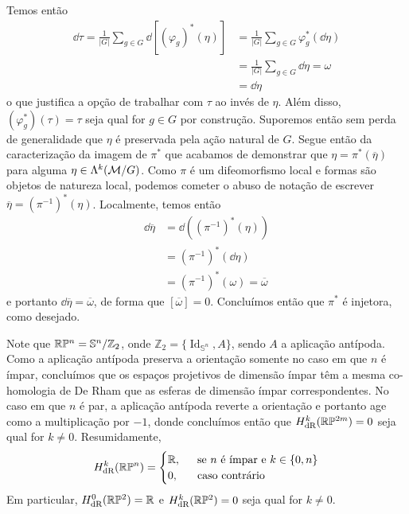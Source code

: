 \begin{dem}
\begin{demm}
Temos então
\begin{align*}
\dd \tau = \frac{1}{|G|} \sum_{g \in G} \dd \left[ (\varphi_g)^{\ast}(\eta)\right] &= \frac{1}{|G|} \sum_{g \in G} \varphi_g^{\ast}(\dd \eta) \\
&= \frac{1}{|G|} \sum_{g \in G} \dd \eta = \omega \\
&= \dd \eta
\end{align*}
o que justifica a opção de trabalhar com $\tau$ ao invés de $\eta$. Além disso, $(\varphi_g^{\ast})(\tau) = \tau$ seja qual for $g \in G$ por construção. Suporemos então sem perda de generalidade que $\eta$ é preservada pela ação natural de $G$. Segue então da caracterização da imagem de $\pi^{\ast}$ que acabamos de demonstrar que $\eta = \pi^{\ast}(\overline{\eta})$ para alguma $\eta \in \Lambda^k(\mm / G)$. Como $\pi$ é um difeomorfismo local e formas são objetos de natureza local, podemos cometer o abuso de notação de escrever $\overline{\eta} = \left(\pi^{-1}\right)^{\ast}(\eta)$. Localmente, temos então
\begin{align*}
\dd \overline{\eta} &= \dd\left(  \left(\pi^{-1}\right)^{\ast}(\eta)\right) \\
&=\left(\pi^{-1}\right)^{\ast} (\dd \eta ) \\
&= \left(\pi^{-1}\right)^{\ast} (\omega) = \overline{\omega}
\end{align*} 
e portanto $\dd \overline{\eta} = \overline{\omega}$, de forma que $[\overline{\omega}] = 0$. Concluímos então que $\pi^{\ast}$ é injetora, como desejado. 
\end{demm}
Note que $\P^n = \mathbb{S}^n / \mathbb{Z}_2$, onde $\mathbb{Z}_2 = \{\operatorname{Id}_{\mathbb{S}^n}, A\}$, sendo $A$ a aplicação antípoda. Como a aplicação antípoda preserva a orientação somente no caso em que $n$ é ímpar, concluímos que os espaços projetivos de dimensão ímpar têm a mesma co-homologia de De Rham que as esferas de dimensão ímpar correspondentes. No caso em que $n$ é par, a aplicação antípoda reverte a orientação e portanto age como a multiplicação por $-1$, donde concluímos então que $H^k_{\text{dR}}(\P^{2m}) = 0$ seja qual for $k \neq 0$. Resumidamente,
$$
H_{\text{dR}}^k(\P^n) =\begin{cases}
\R, & \ \text{ se $n$ é ímpar e } k \in \{0, n \} \\
0, & \ \text{ caso contrário}
\end{cases}
$$
Em particular, $H^0_{\text{dR}}(\P^2) = \mathbb{R}$ e $H^k_{\text{dR}}(\P^2) = 0$ seja qual for $k \neq 0$.
\end{dem}

